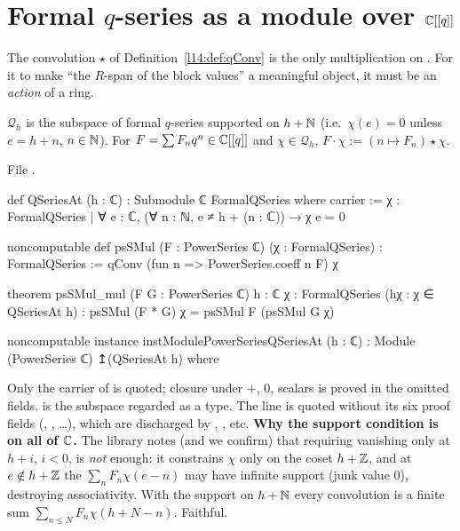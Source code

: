 \section{Formal \texorpdfstring{$q$}{q}-series as a module over \texorpdfstring{${\mathbb{C}}[[q]]$}{C[[q]]}}\label{l14:sec:qconvmodule}

The convolution $\star$ of Definition~\ref{l14:def:qConv} is the only multiplication on . For it to make
``the $R$-span of the block values'' a meaningful object, it must be an \emph{action} of a ring.

\begin{definition}\label{l14:def:QSeriesAt}
$\mathcal Q_h$ is the subspace of formal $q$-series supported on $h+{\mathbb{N}}$ (i.e.\ $\chi(e) = 0$ unless $e = h+n$, $n\in{\mathbb{N}}$). For
$F = \sum F_nq^n\in{\mathbb{C}}[[q]]$ and $\chi\in\mathcal Q_h$, $F\cdot\chi := (n\mapsto F_n)\star\chi$.
\end{definition}
\noindent File .
\begin{leancode}
def QSeriesAt (h : ℂ) : Submodule ℂ FormalQSeries where
  carrier := {χ : FormalQSeries | ∀ e : ℂ, (∀ n : ℕ, e ≠ h + (n : ℂ)) → χ e = 0}

noncomputable def psSMul (F : PowerSeries ℂ) (χ : FormalQSeries) : FormalQSeries :=
  qConv (fun n => PowerSeries.coeff n F) χ

theorem psSMul_mul (F G : PowerSeries ℂ) {h : ℂ} {χ : FormalQSeries} (hχ : χ ∈ QSeriesAt h) :
    psSMul (F * G) χ = psSMul F (psSMul G χ)

noncomputable instance instModulePowerSeriesQSeriesAt (h : ℂ) :
    Module (PowerSeries ℂ) ↥(QSeriesAt h) where
\end{leancode}
\begin{dictionary}
Only the carrier of  is quoted; closure under $+$, $0$, scalars is proved in the omitted fields.
 is the subspace regarded as a type. The  line is quoted without its six proof fields
(, , \dots), which are discharged by , , etc.
\textbf{Why the support condition is on all of ${\mathbb{C}}$.} The library notes (and we confirm) that requiring vanishing only at
$h+i$, $i<0$, is \emph{not} enough: it constrains $\chi$ only on the coset $h+{\mathbb{Z}}$, and at $e\notin h+{\mathbb{Z}}$ the 
$\sum_n F_n\chi(e-n)$ may have infinite support (junk value $0$), destroying associativity. With the support on $h+{\mathbb{N}}$ every
convolution is a finite sum $\sum_{n\le N}F_n\chi(h+N-n)$. Faithful.
\end{dictionary}
